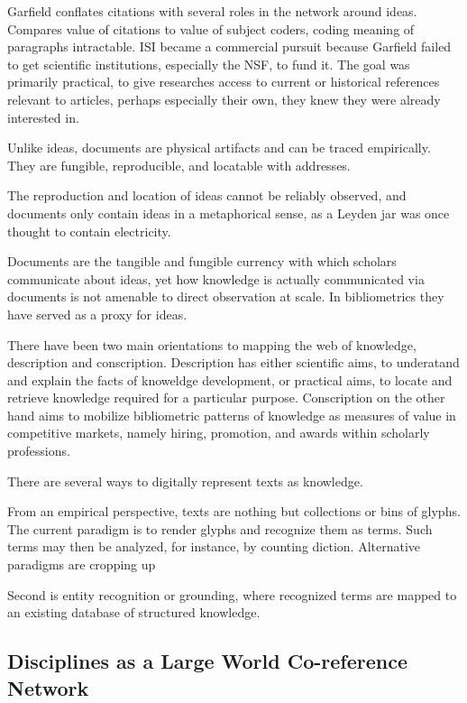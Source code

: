 \documentclass[]{book}
\theoremstyle{definition}
\theoremstyle{definition}
\theoremstyle{definition}
\theoremstyle{remark}
\begin{document}
\citep{Lederberg2000How} Garfield conflates citations with several roles
in the network around ideas. Compares value of citations to value of
subject coders, coding meaning of paragraphs intractable. ISI became a
commercial pursuit because Garfield failed to get scientific
institutions, especially the NSF, to fund it. The goal was primarily
practical, to give researches access to current or historical references
relevant to articles, perhaps especially their own, they knew they were
already interested in.

Unlike ideas, documents are physical artifacts and can be traced
empirically. They are fungible, reproducible, and locatable with
addresses.

The reproduction and location of ideas cannot be reliably observed, and
documents only contain ideas in a metaphorical sense, as a Leyden jar
was once thought to contain electricity.

Documents are the tangible and fungible currency with which scholars
communicate about ideas, yet how knowledge is actually communicated via
documents is not amenable to direct observation at scale. In
bibliometrics they have served as a proxy for ideas.

There have been two main orientations to mapping the web of knowledge,
description and conscription. Description has either scientific aims, to
underatand and explain the facts of knoweldge development, or practical
aims, to locate and retrieve knowledge required for a particular
purpose. Conscription on the other hand aims to mobilize bibliometric
patterns of knowledge as measures of value in competitive markets,
namely hiring, promotion, and awards within scholarly professions.

There are several ways to digitally represent texts as knowledge.

From an empirical perspective, texts are nothing but collections or bins
of glyphs. The current paradigm is to render glyphs and recognize them
as terms. Such terms may then be analyzed, for instance, by counting
diction. Alternative paradigms are cropping up

Second is entity recognition or grounding, where recognized terms are
mapped to an existing database of structured knowledge.

\citep{Pilkington2009evolution}

\hypertarget{disciplines-as-a-large-world-co-reference-network}{%
\subsection{Disciplines as a Large World Co-reference
Network}\label{disciplines-as-a-large-world-co-reference-network}}
\end{document}
